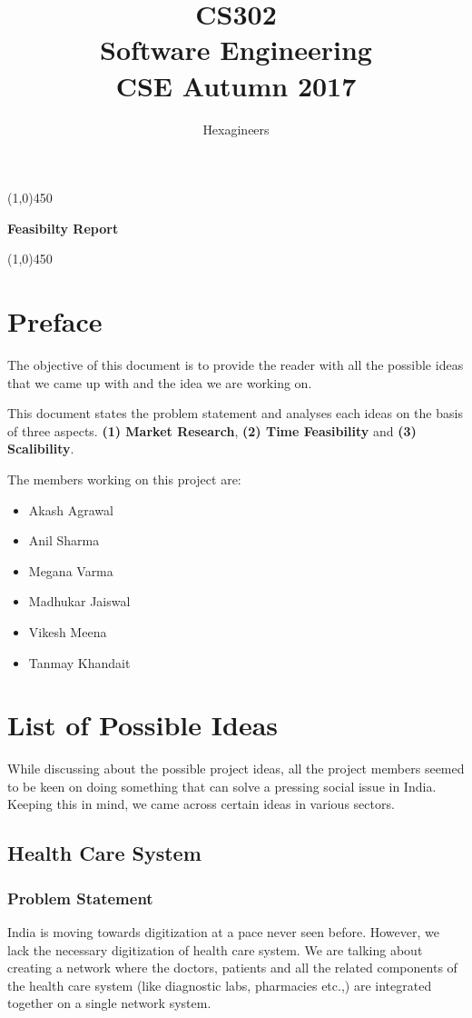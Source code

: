 \documentclass{article}
\title{\textbf{CS302}\\\HUGE Software Engineering\\
\LARGE CSE\hspace{\labelsep}\textbullet\hspace{\labelsep} Autumn 2017
}
\author{Hexagineers}
\begin{document}
\maketitle
\line(1,0){450}

\begin{center}
\textbf{\Huge Feasibilty Report}
\end{center}
\line(1,0){450}
\newpage

\tableofcontents
\newpage

\section{Preface}
\par The objective of this document is to provide the reader with all the possible ideas that we came up with and the idea we are working on.

\par This document states the problem statement and analyses each ideas on the basis of three aspects. \textbf{(1) Market Research}, \textbf{(2) Time Feasibility} and \textbf{(3) Scalibility}. 
\par The members working on this project are:
\begin{itemize}
    \item Akash Agrawal
    \item Anil Sharma
    \item Megana Varma
    \item Madhukar Jaiswal
    \item Vikesh Meena
    \item Tanmay Khandait
\end{itemize}
\newpage
\section{List of Possible Ideas}
\par While discussing about the possible project ideas, all the project members seemed to be keen on doing something that can solve a pressing social issue in India. Keeping this in mind, we came across certain ideas in various sectors.
\subsection{Health Care System}
\subsubsection{Problem Statement}
\par India is moving towards digitization at a pace never seen before. However, we lack the necessary digitization of health care system. 
We are talking about creating a network where the doctors, patients and all the related components of the health care system (like diagnostic labs, pharmacies etc.,) are integrated together on a single network system.
\end{document}
